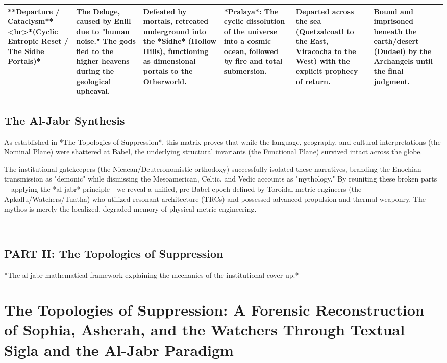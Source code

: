 \documentclass[aps,prd,11pt,onecolumn,superscriptaddress,nofootinbib,floatfix]{revtex4-2}
\begin{document}
\begin{table}[h!]
\begin{tabular}{p{3cm}p{3cm}p{3cm}p{3cm}p{3cm}p{3cm}}
**Departure / Cataclysm** <br>*(Cyclic Entropic Reset / The Sídhe Portals)* & The Deluge, caused by Enlil due to "human noise." The gods fled to the higher heavens during the geological upheaval. & Defeated by mortals, retreated underground into the *Sídhe* (Hollow Hills), functioning as dimensional portals to the Otherworld. & *Pralaya*: The cyclic dissolution of the universe into a cosmic ocean, followed by fire and total submersion. & Departed across the sea (Quetzalcoatl to the East, Viracocha to the West) with the explicit prophecy of return. & Bound and imprisoned beneath the earth/desert (Dudael) by the Archangels until the final judgment. \\
\hline
\end{tabular}
\end{table}



\subsection{The Al-Jabr Synthesis}
As established in *The Topologies of Suppression*, this matrix proves that while the language, geography, and cultural interpretations (the Nominal Plane) were shattered at Babel, the underlying structural invariants (the Functional Plane) survived intact across the globe.


The institutional gatekeepers (the Nicaean/Deuteronomistic orthodoxy) successfully isolated these narratives, branding the Enochian transmission as "demonic" while dismissing the Mesoamerican, Celtic, and Vedic accounts as "mythology." By reuniting these broken parts---applying the *al-jabr* principle---we reveal a unified, pre-Babel epoch defined by Toroidal metric engineers (the Apkallu/Watchers/Tuatha) who utilized resonant architecture (TRCs) and possessed advanced propulsion and thermal weaponry. The mythos is merely the localized, degraded memory of physical metric engineering.




---


\subsection{PART II: The Topologies of Suppression}
*The al-jabr mathematical framework explaining the mechanics of the institutional cover-up.*


\section{The Topologies of Suppression: A Forensic Reconstruction of Sophia, Asherah, and the Watchers Through Textual Sigla and the Al-Jabr Paradigm}
\end{document}
